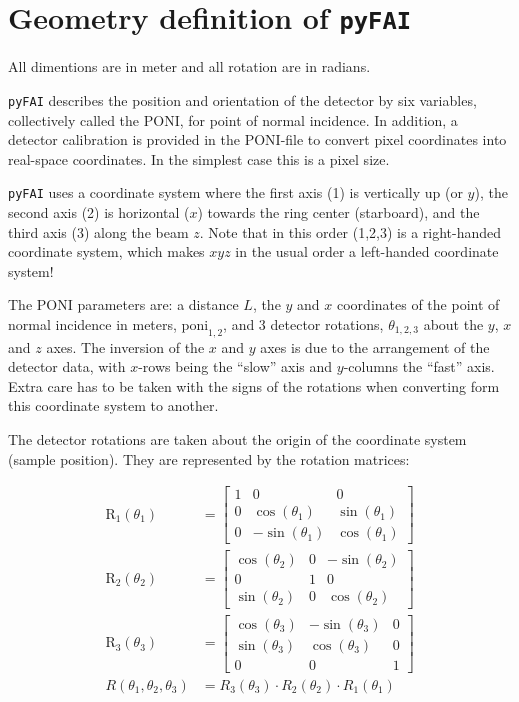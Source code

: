 \documentclass[12pt]{article}
\begin{document}
\section{Geometry definition of \texttt{pyFAI}}

All dimentions are in meter and all rotation are in radians.

\texttt{pyFAI} describes the position and orientation of the detector
by six variables, collectively called the PONI, for point of normal
incidence. In addition, a detector calibration is provided in the
PONI-file to convert pixel coordinates into real-space coordinates. In
the simplest case this is a pixel size.  

\texttt{pyFAI} uses a coordinate system where the first axis (1)  is 
vertically up (or $y$), the second axis (2) is horizontal ($x$) towards the ring
center (starboard), and the third axis (3) along the beam $z$. Note that
in this order (1,2,3) is a right-handed coordinate system, which makes
$xyz$ in the usual order a left-handed coordinate system!

The PONI parameters are: a distance $L$, the $y$ and $x$ coordinates
of the point of normal incidence in meters, $\mathrm{poni}_{1,2}$, and
3 detector rotations, $\theta_{1,2,3}$ about the $y$, $x$ and $z$
axes. The inversion of the $x$ and $y$ axes is due to the arrangement
of the detector data, with $x$-rows being the ``slow'' axis and
$y$-columns the ``fast'' axis. Extra care has to be taken with the
signs of the rotations when converting form this coordinate system to
another.

The detector rotations are taken about the origin of the coordinate
system (sample position). They are represented by the rotation
matrices:

\begin{align}
  \mathrm{R}_1(\theta_1)
  & =
  \begin{bmatrix}
    1 & 0 & 0 \\
    0 & \cos(\theta_1) & \sin(\theta_1) \\
    0 & -\sin(\theta_1) & \cos(\theta_1)
  \end{bmatrix}
  \\
  \mathrm{R}_2(\theta_2)
  & =
  \begin{bmatrix}
    \cos(\theta_2) & 0 & -\sin(\theta_2) \\
    0 & 1 & 0 \\
    \sin(\theta_2) & 0 & \cos(\theta_2)
  \end{bmatrix}
  \\
  \mathrm{R}_3(\theta_3)
  & =
  \begin{bmatrix}
    \cos(\theta_3) & -\sin(\theta_3) & 0\\
    \sin(\theta_3) & \cos(\theta_3) & 0\\
    0 & 0 & 1  
  \end{bmatrix}
  \\
  R(\theta_1, \theta_2, \theta_3)
  & =
  R_3(\theta_3) \cdot R_2(\theta_2) \cdot R_1(\theta_1)
\end{align}
\end{document}
